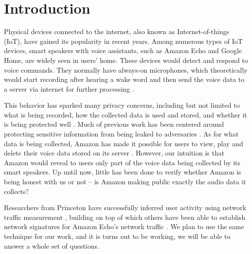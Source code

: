 \section{Introduction}
Physical devices connected to the internet, also known as Internet-of-things (IoT), have gained its popularity in recent years. Among numerous types of IoT devices, smart speakers with voice assistants, such as Amazon Echo and Google Home, are widely seen in users' home. These devices would detect and respond to voice commands. They normally have always-on microphones, which theoretically would start recording after hearing a wake word and then send the voice data to a server via internet for further processing \cite{AmazonEc68:online}.

This behavior has sparked many privacy concerns, including but not limited to what is being recorded, how the collected data is used and stored, and whether it is being protected well \cite{lau2018alexa, fowler_2019, apthorpe2017smart, apthorpe2019keeping, apthorpe2017spying}. Much of previous work has been centered around protecting sensitive information from being leaked to adversaries \cite{apthorpe2017smart, apthorpe2019keeping, apthorpe2017spying}. As for what data is being collected, Amazon has made it possible for users to view, play and delete their voice data stored on its server \cite{ford2019alexa}. However, our intuition is that Amazon would reveal to users only part of the voice data being collected by its smart speakers. Up until now, little has been done to verify whether Amazon is being honest with us or not -- is Amazon making public exactly the audio data it collects?

Researchers from Princeton have successfully inferred user activity using network traffic measurement \cite{apthorpe2017spying}, building on top of which others have been able to establish network signatures for Amazon Echo's network traffic \cite{ford2019alexa}. We plan to use the same technique for our work, and it is turns out to be working, we will be able to answer a whole set of questions.
